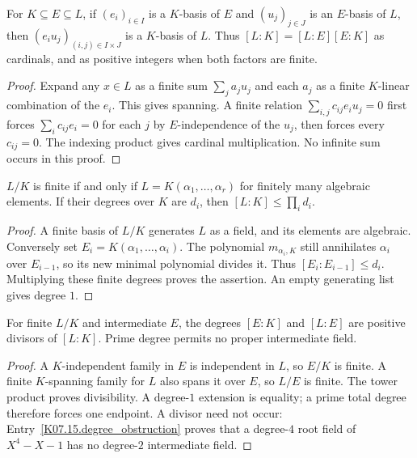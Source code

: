 \begin{theorem}
For $K\subseteq E\subseteq L$, if $(e_i)_{i\in I}$ is a $K$-basis of $E$ and $(u_j)_{j\in J}$ is an $E$-basis of $L$, then $(e_i u_j)_{(i,j)\in I\times J}$ is a $K$-basis of $L$. Thus $[L:K]=[L:E][E:K]$ as cardinals, and as positive integers when both factors are finite.
\end{theorem}
\begin{proof}
Expand any $x\in L$ as a finite sum $\sum_j a_j u_j$ and each $a_j$ as a finite $K$-linear combination of the $e_i$. This gives spanning. A finite relation $\sum_{i,j}c_{ij}e_i u_j=0$ first forces $\sum_i c_{ij}e_i=0$ for each $j$ by $E$-independence of the $u_j$, then forces every $c_{ij}=0$. The indexing product gives cardinal multiplication. No infinite sum occurs in this proof.
\end{proof}

\begin{theorem}
$L/K$ is finite if and only if $L=K(\alpha_1,\ldots,\alpha_r)$ for finitely many algebraic elements. If their degrees over $K$ are $d_i$, then $[L:K]\leq\prod_i d_i$.
\end{theorem}
\begin{proof}
A finite basis of $L/K$ generates $L$ as a field, and its elements are algebraic. Conversely set $E_i=K(\alpha_1,\ldots,\alpha_i)$. The polynomial $m_{\alpha_i,K}$ still annihilates $\alpha_i$ over $E_{i-1}$, so its new minimal polynomial divides it. Thus $[E_i:E_{i-1}]\leq d_i$. Multiplying these finite degrees proves the assertion. An empty generating list gives degree $1$.
\end{proof}

\begin{corollary}
For finite $L/K$ and intermediate $E$, the degrees $[E:K]$ and $[L:E]$ are positive divisors of $[L:K]$. Prime degree permits no proper intermediate field.
\end{corollary}
\begin{proof}
A $K$-independent family in $E$ is independent in $L$, so $E/K$ is finite. A finite $K$-spanning family for $L$ also spans it over $E$, so $L/E$ is finite. The tower product proves divisibility. A degree-$1$ extension is equality; a prime total degree therefore forces one endpoint. A divisor need not occur: Entry~\ref{K07.15.degree_obstruction} proves that a degree-$4$ root field of $X^4-X-1$ has no degree-$2$ intermediate field.
\end{proof}

